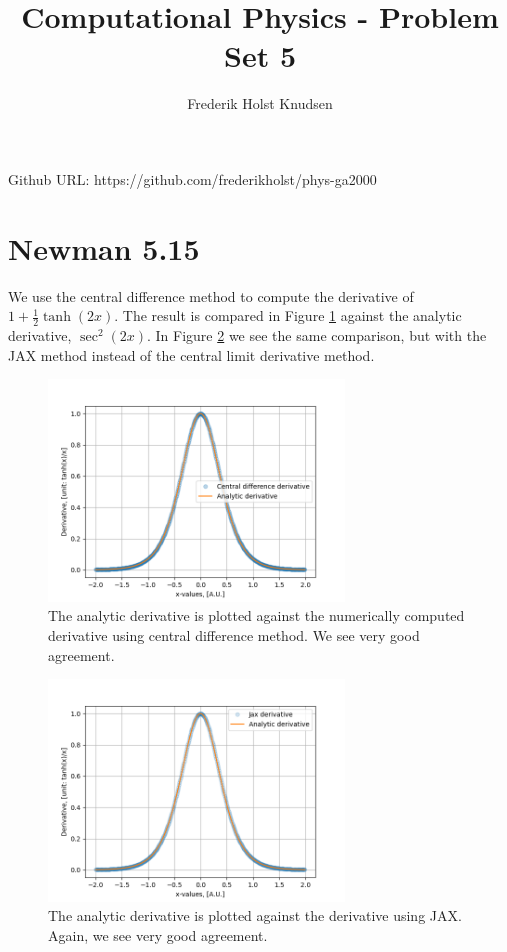 \documentclass[11pt]{article}
\title{Computational Physics -  Problem Set 5}
\author{Frederik Holst Knudsen}
\begin{document}
\maketitle
Github URL: https://github.com/frederikholst/phys-ga2000
\section{Newman 5.15}
We use the central difference method to compute the derivative of $1+\frac{1}{2}\tanh(2x)$. The result is compared in Figure \ref{cent} against the analytic derivative, $\sec^2(2x)$. In Figure \ref{jax} we see the same comparison, but with the JAX method instead of the central limit derivative method.
\begin{figure}[!htbp]
    \centering
    \includegraphics[width=0.7\textwidth]{problem1.png}
    \caption{The analytic derivative is plotted against the numerically computed derivative using central difference method. We see very good agreement.}
    \label{cent}
\end{figure}
\begin{figure}[!htbp]
    \centering
    \includegraphics[width=0.7\textwidth]{Jax.png}
    \caption{The analytic derivative is plotted against the derivative using JAX. Again, we see very good agreement.}
    \label{jax}
\end{figure}
\end{document}
